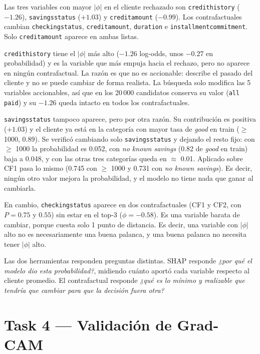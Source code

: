 \documentclass[11pt]{article}
\renewcommand{\_}{\textunderscore\allowbreak{}}
\begin{document}
Las tres variables con mayor \(|\phi|\) en el cliente rechazado son \texttt{credit\_history} (\(-1.26\)), \texttt{savings\_status} (\(+1.03\)) y \texttt{credit\_amount} (\(-0.99\)). Los contrafactuales cambian \texttt{checking\_status}, \texttt{credit\_amount}, \texttt{duration} e \texttt{installment\_commitment}. Solo \texttt{credit\_amount} aparece en ambas listas.

\texttt{credit\_history} tiene el \(|\phi|\) más alto (\(-1.26\) log-odds, unos \(-0.27\) en probabilidad) y es la variable que más empuja hacia el rechazo, pero no aparece en ningún contrafactual. La razón es que no es accionable: describe el pasado del cliente y no se puede cambiar de forma realista. La búsqueda solo modifica las 5 variables accionables, así que en los 20\,000 candidatos conserva su valor (\texttt{all paid}) y su \(-1.26\) queda intacto en todos los contrafactuales.

\texttt{savings\_status} tampoco aparece, pero por otra razón. Su contribución es positiva (\(+1.03\)) y el cliente ya está en la categoría con mayor tasa de \emph{good} en train (\(\geq\) 1000, 0.89). Se verificó cambiando solo \texttt{savings\_status} y dejando el resto fijo: con \(\geq\) 1000 la probabilidad es 0.052, con \emph{no known savings} (0.82 de \emph{good} en train) baja a 0.048, y con las otras tres categorías queda en \(\approx\) 0.01. Aplicado sobre CF1 pasa lo mismo (0.745 con \(\geq\) 1000 y 0.731 con \emph{no known savings}). Es decir, ningún otro valor mejora la probabilidad, y el modelo no tiene nada que ganar al cambiarla.

En cambio, \texttt{checking\_status} aparece en dos contrafactuales (CF1 y CF2, con \(P = 0.75\) y \(0.55\)) sin estar en el top-3 (\(\phi = -0.58\)). Es una variable barata de cambiar, porque cuesta solo 1 punto de distancia. Es decir, una variable con \(|\phi|\) alto no es necesariamente una buena palanca, y una buena palanca no necesita tener \(|\phi|\) alto.

Las dos herramientas responden preguntas distintas. SHAP responde \emph{¿por qué el modelo dio esta probabilidad?}, midiendo cuánto aportó cada variable respecto al cliente promedio. El contrafactual responde \emph{¿qué es lo mínimo y realizable que tendría que cambiar para que la decisión fuera otra?}

\newpage
\section*{Task 4 --- Validación de Grad-CAM}
\end{document}

